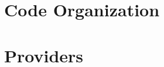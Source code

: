 \begin{appendices}
\chapter{Code Organization}
\label{chap:opendtrace-code}


\chapter{Providers}
\label{chap:opendtrace-providers}


\end{appendices}






